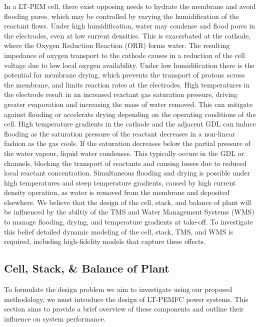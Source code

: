 In a LT-PEM cell, there exist opposing needs to hydrate the membrane and avoid flooding pores, which may be controlled by varying the humidification of the reactant flows.
Under high humidification, water may condense and flood pores in the electrodes, even at low current densities.
This is exacerbated at the cathode, where the Oxygen Reduction Reaction (ORR) forms water.
The resulting impedance of oxygen transport to the cathode causes in a reduction of the cell voltage due to low local oxygen availability.
Under low humidification there is the potential for membrane drying, which prevents the transport of protons across the membrane, and limits reaction rates at the electrodes.
High temperatures in the electrode result in an increased reactant gas saturation pressure, driving greater evaporation and increasing the mass of water removed.
This can mitigate against flooding or accelerate drying depending on the operating conditions of the cell.
High temperature gradients in the cathode and the adjacent GDL can induce flooding as the saturation pressure of the reactant decreases in a non-linear fashion as the gas cools.
If the saturation decreases below the partial pressure of the water vapour, liquid water condenses.
This typically occurs in the GDL or channels, blocking the transport of reactants and causing losses due to reduced local reactant concentration.
Simultaneous flooding and drying is possible under high temperatures and steep temperature gradients, caused by high current density operation, as water is removed from the membrane and deposited elsewhere.
We believe that the design of the cell, stack, and balance of plant will be influenced by the abiltiy of the TMS and Water Management Systems (WMS) to manage flooding, drying, and temperature gradients at take-off.
To investigate this belief detailed dynamic modeling of the cell, stack, TMS, and WMS is required, including high-fidelity models that capture these effects.

\subsection{Cell, Stack, \& Balance of Plant} \label{sec:design}
To formulate the design problem we aim to investigate using our proposed methodology, we must introduce the design of LT-PEMFC power systems. This section aims to provide a brief overview of these components and outline their influence on system performance.

